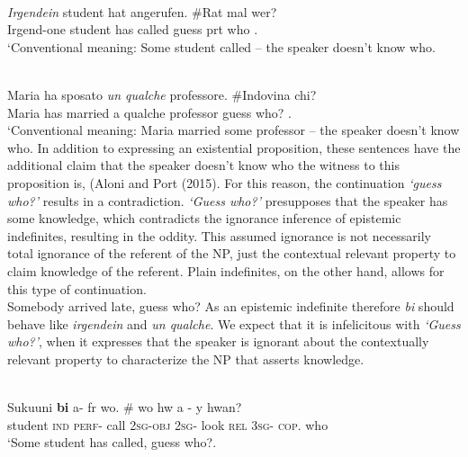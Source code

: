 \documentclass[output=paper,
modfonts
]{langsci/langscibook}
\begin{document}
\ea\label{ex26}\\
 \gll\emph{Irgendein} student hat angerufen. \#Rat mal wer?  \\
     Irgend-one student has called guess prt who .\\
\glt `Conventional meaning: Some student called – the speaker doesn’t know who.

\ex \label{ex28}\\
\gll Maria ha sposato \emph{un qualche} professore. \#Indovina chi? \\
      Maria has married a qualche professor guess who? .\\
\glt `Conventional meaning: Maria married some professor – the speaker doesn’t know who.
\z In addition to expressing an existential proposition, these sentences have the additional claim that the speaker doesn't know who the witness to this proposition is, (Aloni and Port (2015). For this reason, the continuation \emph{`guess who?'} results in a contradiction. \emph{`Guess who?'} presupposes that the speaker has some knowledge, which contradicts the ignorance inference of epistemic indefinites, resulting in the oddity.  This assumed ignorance is not necessarily total ignorance of the referent of the NP,  just the contextual relevant property to claim knowledge of the referent. Plain indefinites, on the other hand, allows for this type of continuation.
  \ea\label{ex26}\\
 Somebody arrived late, guess who?
 \z As an epistemic indefinite therefore \emph{bi} should behave like \emph{irgendein} and \emph{un qualche}. We expect that it is infelicitous with \emph{`Guess who?'}, when it expresses that the speaker is ignorant about the contextually relevant property to characterize the NP that asserts knowledge.  


\ea {}\\
 \ea\label{ex30}
 \gll Sukuuni \textbf{bi} a- fr wo. \# wo hw a - y hwan? \\
     student \textsc{ind} \textsc{perf}- call       \textsc{2sg}-\textsc{obj} {} \textsc{2sg}- look  \textsc{rel} \textsc{3sg}- \textsc{cop}. who \\
\glt `Some student has called, guess who?.
\end{document}
